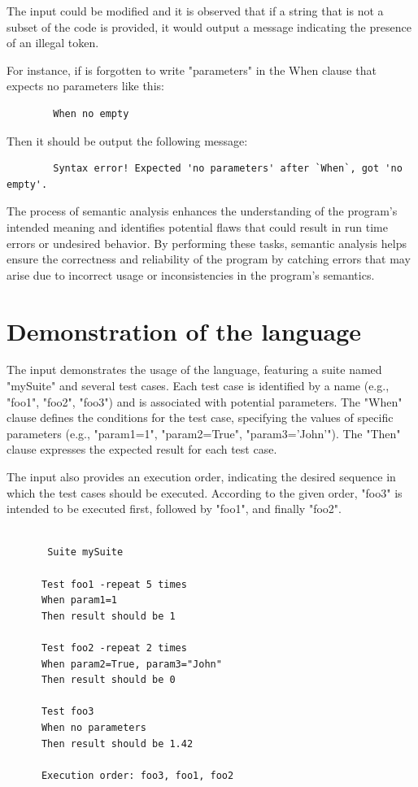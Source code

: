 The input could be modified and it is observed that if a string that is not a subset of the code is provided, it would output a message indicating the presence of an illegal token.

For instance, if is forgotten to write "parameters" in the When clause that expects no parameters like this:

\begin{verbatim}
        When no empty
\end{verbatim}

Then it should be output the following message:
 
\begin{verbatim}
        Syntax error! Expected 'no parameters' after `When`, got 'no empty'.
\end{verbatim}

The process of semantic analysis enhances the understanding of the program's intended meaning and identifies potential flaws that could result in run time errors or undesired behavior. By performing these tasks, semantic analysis helps ensure the correctness and reliability of the program by catching errors that may arise due to incorrect usage or inconsistencies in the program's semantics.

\section{Demonstration of the language}

The input demonstrates the usage of the language, featuring a suite named "mySuite" and several test cases. Each test case is identified by a name (e.g., "foo1", "foo2", "foo3") and is associated with potential parameters. The "When" clause defines the conditions for the test case, specifying the values of specific parameters (e.g., "param1=1", "param2=True", "param3='John'"). The "Then" clause expresses the expected result for each test case.

The input also provides an execution order, indicating the desired sequence in which the test cases should be executed. According to the given order, "foo3" is intended to be executed first, followed by "foo1", and finally "foo2".

\begin{verbatim}

       Suite mySuite

      Test foo1 -repeat 5 times
      When param1=1
      Then result should be 1

      Test foo2 -repeat 2 times
      When param2=True, param3="John"
      Then result should be 0

      Test foo3 
      When no parameters
      Then result should be 1.42

      Execution order: foo3, foo1, foo2
      
\end{verbatim}

